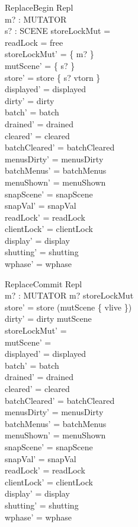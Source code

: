 \documentclass[a4paper,10pt,fleqn]{article}
\begin{document}
\begin{schema}{ReplaceBegin}
  \Delta Repl \\
  m? : MUTATOR \\
  s? : SCENE
\where
  storeLockMut = \emptyset \\
  readLock = free \\
  storeLockMut' = \{ m? \} \\
  mutScene' = \{ s? \} \\
  store' = store \oplus \{ s? \mapsto vtorn \} \\
  displayed' = displayed \\
  dirty' = dirty \\
  batch' = batch \\
  drained' = drained \\
  cleared' = cleared \\
  batchCleared' = batchCleared \\
  menusDirty' = menusDirty \\
  batchMenus' = batchMenus \\
  menuShown' = menuShown \\
  snapScene' = snapScene \\
  snapVal' = snapVal \\
  readLock' = readLock \\
  clientLock' = clientLock \\
  display' = display \\
  shutting' = shutting \\
  wphase' = wphase
\end{schema}

\begin{schema}{ReplaceCommit}
  \Delta Repl \\
  m? : MUTATOR
\where
  m? \in storeLockMut \\
  store' = store \oplus (mutScene \cross \{ vlive \}) \\
  dirty' = dirty \cup mutScene \\
  storeLockMut' = \emptyset \\
  mutScene' = \emptyset \\
  displayed' = displayed \\
  batch' = batch \\
  drained' = drained \\
  cleared' = cleared \\
  batchCleared' = batchCleared \\
  menusDirty' = menusDirty \\
  batchMenus' = batchMenus \\
  menuShown' = menuShown \\
  snapScene' = snapScene \\
  snapVal' = snapVal \\
  readLock' = readLock \\
  clientLock' = clientLock \\
  display' = display \\
  shutting' = shutting \\
  wphase' = wphase
\end{schema}
\end{document}
